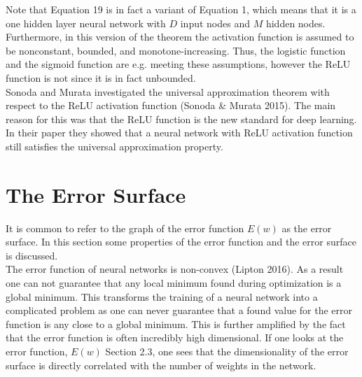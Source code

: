 \documentclass[11pt, letterpaper]{amsart}
\begin{document}
Note that Equation 19 is in fact a variant of Equation 1, which means that it is a one hidden layer neural network with $D$ input nodes and $M$ hidden nodes. Furthermore, in this version of the theorem the activation function is assumed to be nonconstant, bounded, and monotone-increasing. Thus, the logistic function and the sigmoid function are e.g. meeting these assumptions, however the ReLU function is not since it is in fact unbounded.
\\

Sonoda and Murata investigated the universal approximation theorem with respect to the ReLU activation function (Sonoda \& Murata 2015). The main reason for this was that the ReLU function is the new standard for deep learning. In their paper they showed that a neural network with ReLU activation function still satisfies the universal approximation property.

\section{The Error Surface}
It is common to refer to the graph of the error function $E(w)$ as the error surface. In this section some properties of the error function and the error surface is discussed.
\\

The error function of neural networks is non-convex (Lipton 2016). As a result one can not guarantee that any local minimum found during optimization is a global minimum. This transforms the training of a neural network into a complicated problem as one can never guarantee that a found value for the error function is any close to a global minimum. This is further amplified by the fact that the error function is often incredibly high dimensional. If one looks at the error function, $E(w)$ Section 2.3, one sees that the dimensionality of the error surface is directly correlated with the number of weights in the network.
\\
\end{document}
